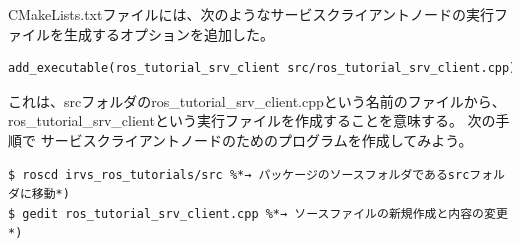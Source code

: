 CMakeLists.txtファイルには、次のようなサービスクライアントノードの実行ファイルを生成するオプションを追加した。

\begin{lstlisting}[language=make]
add_executable(ros_tutorial_srv_client src/ros_tutorial_srv_client.cpp)
\end{lstlisting}

これは、srcフォルダのros\_tutorial\_srv\_client.cppという名前のファイルから、ros\_tutorial\_srv\_clientという実行ファイルを作成することを意味する。
 次の手順で  サービスクライアントノードのためのプログラムを作成してみよう。

\begin{lstlisting}[language=ROS]
$ roscd irvs_ros_tutorials/src %*→ パッケージのソースフォルダであるsrcフォルダに移動*)
$ gedit ros_tutorial_srv_client.cpp %*→ ソースファイルの新規作成と内容の変更*)
\end{lstlisting}

